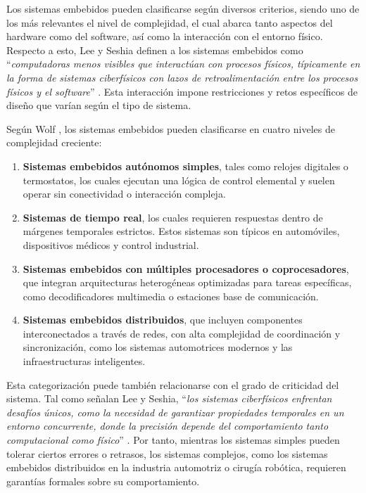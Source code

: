 Los sistemas embebidos pueden clasificarse según diversos criterios, siendo uno de los más relevantes el nivel de complejidad, el cual abarca tanto aspectos del hardware como del software, así como la interacción con el entorno físico. Respecto a esto, Lee y Seshia definen a los sistemas embebidos como ``\textit{computadoras menos visibles que interactúan con procesos físicos, típicamente en la forma de sistemas ciberfísicos con lazos de retroalimentación entre los procesos físicos y el software}'' \cite{lee_introduction_2017}. Esta interacción impone restricciones y retos específicos de diseño que varían según el tipo de sistema.

Según Wolf \cite{wolf_embedded_2012}, los sistemas embebidos pueden clasificarse en cuatro niveles de complejidad creciente: 
\begin{enumerate} 
    \item \textbf{Sistemas embebidos autónomos simples}, tales como relojes digitales o termostatos, los cuales ejecutan una lógica de control elemental y suelen operar sin conectividad o interacción compleja.
    \item \textbf{Sistemas de tiempo real}, los cuales requieren respuestas dentro de márgenes temporales estrictos. Estos sistemas son típicos en automóviles, dispositivos médicos y control industrial.
    \item \textbf{Sistemas embebidos con múltiples procesadores o coprocesadores}, que integran arquitecturas heterogéneas optimizadas para tareas específicas, como decodificadores multimedia o estaciones base de comunicación.
    \item \textbf{Sistemas embebidos distribuidos}, que incluyen componentes interconectados a través de redes, con alta complejidad de coordinación y sincronización, como los sistemas automotrices modernos y las infraestructuras inteligentes.
\end{enumerate}

Esta categorización puede también relacionarse con el grado de criticidad del sistema. Tal como señalan Lee y Seshia, ``\textit{los sistemas ciberfísicos enfrentan desafíos únicos, como la necesidad de garantizar propiedades temporales en un entorno concurrente, donde la precisión depende del comportamiento tanto computacional como físico}'' \cite{lee_introduction_2017}. Por tanto, mientras los sistemas simples pueden tolerar ciertos errores o retrasos, los sistemas complejos, como los sistemas embebidos distribuidos en la industria automotriz o cirugía robótica, requieren garantías formales sobre su comportamiento.


